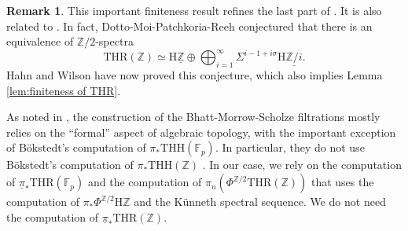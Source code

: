 \documentclass[10pt]{amsart}
\theoremstyle{definition}
\newtheorem{rmk}[thm]{Remark}
\numberwithin{equation}{section}
\newcommand{\F}{\mathbb{F}}
\newcommand{\Z}{\mathbb{Z}}
\newcommand{\rH}{\mathrm{H}}
\newcommand{\ul}{\underline}
\newcommand{\THH}{\mathrm{THH}}
\newcommand{\THR}{\mathrm{THR}}
\begin{document}
\begin{rmk}
\label{DMPR conjecture}
This important finiteness result refines the last part of \cite[Lemma 2.5]{BMS19}.
It is also related to \cite[Theorem 5.24]{DMPR21}. In fact,
Dotto-Moi-Patchkoria-Reeh \cite[Remark 5.23]{DMPR21} conjectured that there is an equivalence of $\Z/2$-spectra
\[
\THR(\Z)
\simeq
\rH \ul{\Z} \oplus \bigoplus_{i=1}^\infty \Sigma^{i-1+i\sigma} \rH \ul{\Z/i}.
\]
Hahn and Wilson \cite[Theorem B.0.1]{AKF} have now proved this conjecture,
which also implies Lemma \ref{lem:finiteness of THR}.

As noted in \cite[Remark 1.5]{BMS19},
the construction of the Bhatt-Morrow-Scholze filtrations mostly relies on the ``formal'' aspect of algebraic topology, with the important exception of B\"okstedt's computation of $\pi_*\THH(\F_p)$.
In particular, they do not use B\"okstedt's computation of $\pi_*\THH(\Z)$ \cite{Boekstedt}.
In our case,
we rely on the computation of $\ul{\pi}_*\THR(\F_p)$ \cite[Theorem 5.15]{DMPR21} and the computation of $\pi_n(\Phi^{\Z/2}\THR(\Z))$  \cite[Theorem 5.20]{DMPR21} that uses the computation of $\pi_*\Phi^{\Z/2}\rH \Z$ and the K\"unneth spectral sequence.
We do not need the computation of $\ul{\pi}_*\THR(\Z)$.
\end{rmk}
\end{document}
